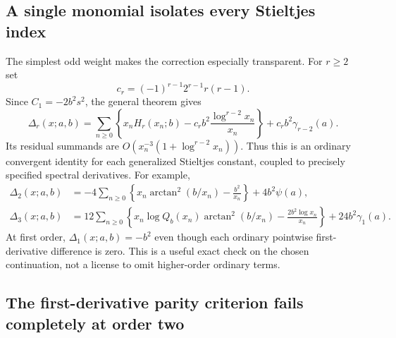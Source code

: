 \subsection{A single monomial isolates every Stieltjes index}

The simplest odd weight makes the correction especially transparent.
For $r\ge2$ set
\[
 c_r=(-1)^{r-1}2^{r-1}r(r-1).
\]
Since $C_1=-2b^2s^2$, the general theorem gives
\begin{equation}\label{sd:eq:linear-weight}
 \boxed{\displaystyle
 \Delta_r(x;a,b)=
 \sum_{n\ge0}\left\{x_nH_r(x_n;b)
       -c_rb^2\frac{\log^{r-2}x_n}{x_n}\right\}
       +c_rb^2\gamma_{r-2}(a).}
\end{equation}
Its residual summands are
$O(x_n^{-3}(1+\log^{r-2}x_n))$.  Thus this is an ordinary convergent
identity for each generalized Stieltjes constant, coupled to precisely
specified spectral derivatives.  For example,
\begin{align}
 \Delta_2(x;a,b)
 &=-4\sum_{n\ge0}
       \left\{x_n\arctan^2(b/x_n)-\frac{b^2}{x_n}\right\}
       +4b^2\psi(a),\label{sd:eq:linear-second}\\
 \Delta_3(x;a,b)
 &=12\sum_{n\ge0}
       \left\{x_n\log Q_b(x_n)\arctan^2(b/x_n)
                      -\frac{2b^2\log x_n}{x_n}\right\}
       +24b^2\gamma_1(a).\label{sd:eq:linear-third}
\end{align}
At first order, $\Delta_1(x;a,b)=-b^2$ even though each ordinary
pointwise first-derivative difference is zero.  This is a useful exact
check on the chosen continuation, not a license to omit higher-order
ordinary terms.

\subsection{The first-derivative parity criterion fails completely at order two}

